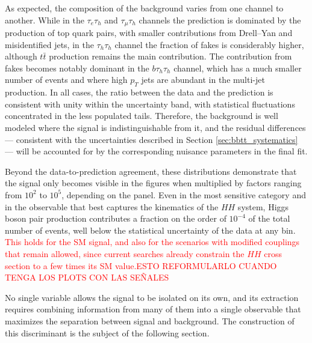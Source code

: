 As expected, the composition of the background varies from one channel to another. While in the $\tau_e\tau_h$ and $\tau_\mu\tau_h$ channels the prediction is dominated by the production of top quark pairs, with smaller contributions from Drell--Yan and misidentified jets, in the $\tau_h\tau_h$ channel the fraction of fakes is considerably higher, although $t\bar{t}$ production remains the main contribution. The contribution from fakes becomes notably dominant in the $b\tau_h\tau_h$ channel, which has a much smaller number of events and where high $p_T$ jets are abundant in the multi-jet production. In all cases, the ratio between the data and the prediction is consistent with unity within the uncertainty band, with statistical fluctuations concentrated in the less populated tails. Therefore, the background is well modeled where the signal is indistinguishable from it, and the residual differences — consistent with the uncertainties described in Section \ref{sec:bbtt_systematics} — will be accounted for by the corresponding nuisance parameters in the final fit.\medskip

Beyond the data-to-prediction agreement, these distributions demonstrate that the signal only becomes visible in the figures when multiplied by factors ranging from $10^2$ to $10^5$, depending on the panel. Even in the most sensitive category and in the observable that best captures the kinematics of the $HH$ system, Higgs boson pair production contributes a fraction on the order of $10^{-4}$ of the total number of events, well below the statistical uncertainty of the data at any bin. \textcolor{red}{This holds for the SM signal, and also for the scenarios with modified couplings that remain allowed, since current searches already constrain the $HH$ cross section to a few times its SM value.ESTO REFORMULARLO CUANDO TENGA LOS PLOTS CON LAS SEÑALES}

No single variable allows the signal to be isolated on its own, and its extraction requires combining information from many of them into a single observable that maximizes the separation between signal and background. The construction of this discriminant is the subject of the following section.







